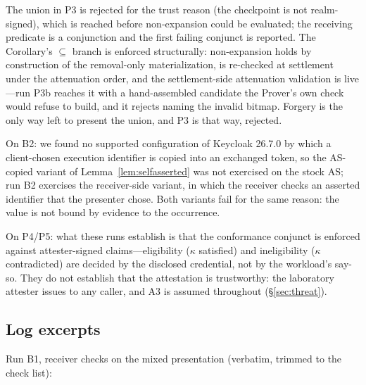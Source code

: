\documentclass[conference]{IEEEtran}
\begin{document}
The union in P3 is rejected for the trust reason (the checkpoint is not realm-signed), which is reached before non-expansion could be evaluated; the receiving predicate is a conjunction and the first failing conjunct is reported. The Corollary's $\subseteq$ branch is enforced structurally: non-expansion holds by construction of the removal-only materialization, is re-checked at settlement under the attenuation order, and the settlement-side attenuation validation is live---run P3b reaches it with a hand-assembled candidate the Prover's own check would refuse to build, and it rejects naming the invalid bitmap. Forgery is the only way left to present the union, and P3 is that way, rejected.

On B2: we found no supported configuration of Keycloak 26.7.0 by which a client-chosen execution identifier is copied into an exchanged token, so the AS-copied variant of Lemma~\ref{lem:selfasserted} was not exercised on the stock AS; run B2 exercises the receiver-side variant, in which the receiver checks an asserted identifier that the presenter chose. Both variants fail for the same reason: the value is not bound by evidence to the occurrence.

On P4/P5: what these runs establish is that the conformance conjunct is enforced against attester-signed claims---eligibility ($\kappa$ satisfied) and ineligibility ($\kappa$ contradicted) are decided by the disclosed credential, not by the workload's say-so. They do not establish that the attestation is trustworthy: the laboratory attester issues to any caller, and A3 is assumed throughout (\S\ref{sec:threat}).

\subsection{Log excerpts}

Run B1, receiver checks on the mixed presentation (verbatim, trimmed to the check list):
\end{document}
